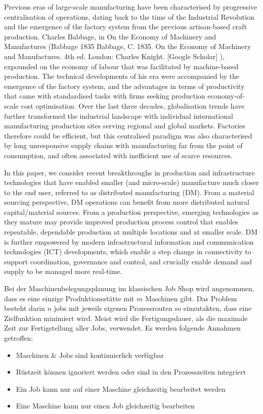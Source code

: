 \documentclass[final, english, ngerman, a4paper, 12pt, %
numbers=noenddot,
cd=true,
cdfont=false,cdfont=nohead,cdfont=nodin,
cdmath=false,
cdhead=false,
cdfoot=true,
cdcover=monochrome,
cdgeometry=symmetric,
declaration=heading,
declaration=notoc,
abstract=heading,
]{tudscrreprt}
\begin{document}
Previous eras of large-scale manufacturing have been characterised by progressive centralisation of operations, dating back to the time of the Industrial Revolution and the emergence of the factory system from the previous artisan-based craft production. Charles Babbage, in On the Economy of Machinery and Manufactures (Babbage 1835 Babbage, C. 1835. On the Economy of Machinery and Manufactures. 4th ed. London: Charles Knight.
[Google Scholar]
), expounded on the economy of labour that was facilitated by machine-based production. The technical developments of his era were accompanied by the emergence of the factory system, and the advantages in terms of productivity that came with standardised tasks with firms seeking production economy-of-scale cost optimisation. Over the last three decades, globalisation trends have further transformed the industrial landscape with individual international manufacturing production sites serving regional and global markets. Factories therefore could be efficient, but this centralised paradigm was also characterised by long unresponsive supply chains with manufacturing far from the point of consumption, and often associated with inefficient use of scarce resources.

In this paper, we consider recent breakthroughs in production and infrastructure technologies that have enabled smaller (and micro-scale) manufacture much closer to the end user, referred to as distributed manufacturing (DM). From a material sourcing perspective, DM operations can benefit from more distributed natural capital/material sources. From a production perspective, emerging technologies as they mature may provide improved production process control that enables repeatable, dependable production at multiple locations and at smaller scale. DM is further empowered by modern infrastructural information and communication technologies (ICT) developments, which enable a step change in connectivity to support coordination, governance and control, and crucially enable demand and supply to be managed more real-time.

Bei der Maschinenbelegungsplanung im klassischen Job Shop wird angenommen, dass es eine einzige
Produktionsstätte mit \(m\) Maschinen gibt. Das Problem besteht darin
\(n\) jobs mit jeweils eigenen Prozessrouten so einzutakten, dass eine
Zielfunktion minimiert wird. Meist wird die Fertigungsdauer, als die
maximale Zeit zur Fertigstellung aller Jobs, verwendet. Es werden
folgende Annahmen getroffen:

\begin{itemize}
	\item
	Maschinen \& Jobs sind kontinuierlich verfügbar
	\item
	Rüstzeit können ignoriert werden oder sind in den Prozesszeiten
	integriert
	\item
	Ein Job kann nur auf einer Maschine gleichzeitig bearbeitet werden
	\item
	Eine Maschine kann nur einen Job gleichzeitig bearbeiten
\end{itemize}
\end{document}
